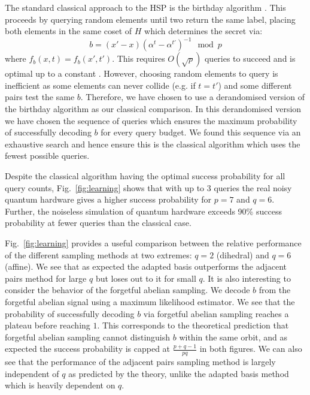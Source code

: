 \documentclass[aps,floatfix,10pt,amssymb,amsfont,amsmath,superscriptaddress,float,nofootinbib,longbibliography,nobalancelastpage,twocolumn]{revtex4-2}
\begin{document}
The standard classical approach to the HSP is the birthday algorithm \cite{simon1997power,nayak2021deterministic}. This proceeds by querying random elements until two return the same label, placing both elements in the same coset of $H$ which determines the secret via:
\begin{equation}
    b = (x'-x)(\alpha^t - \alpha^{t'})^{-1} \mod p
\end{equation}
where $f_b(x,t) = f_b(x',t')$. This requires $O(\sqrt{p})$ queries to succeed and is optimal up to a constant \cite{nayak2021deterministic,childs2017lecture}. However, choosing random elements to query is inefficient as some elements can never collide (e.g. if $t=t'$) and some different pairs test the same $b$. Therefore, we have chosen to use a derandomised version of the birthday algorithm \cite{nayak2021deterministic} as our classical comparison. In this derandomised version we have chosen the sequence of queries which ensures the maximum probability of successfully decoding $b$ for every query budget. We found this sequence via an exhaustive search and hence ensure this is the classical algorithm which uses the fewest possible queries. 

Despite the classical algorithm having the optimal success probability for all query counts, Fig.~\ref{fig:learning} shows that with up to 3 queries the real noisy quantum hardware gives a higher success probability for $p=7$ and $q=6$. Further, the noiseless simulation of quantum hardware exceeds 90\% success probability at fewer queries than the classical case. 

Fig.~\ref{fig:learning} provides a useful comparison between the relative performance of the different sampling methods at two extremes: $q=2$ (dihedral) and $q=6$ (affine). We see that as expected the adapted basis outperforms the adjacent pairs method for large $q$ but loses out to it for small $q$. It is also interesting to consider the behavior of the forgetful abelian sampling. We decode $b$ from the forgetful abelian signal using a maximum likelihood estimator. We see that the probability of successfully decoding $b$ via forgetful abelian sampling reaches a plateau before reaching $1$. This corresponds to the theoretical prediction that forgetful abelian sampling cannot distinguish $b$ within the same orbit, and as expected the success probability is capped at $\frac{p+q-1}{pq}$ in both figures. We can also see that the performance of the adjacent pairs sampling method is largely independent of $q$ as predicted by the theory, unlike the adapted basis method which is heavily dependent on $q$.
\end{document}
